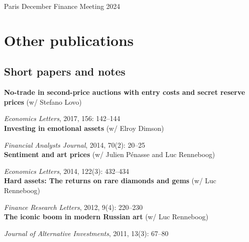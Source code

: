 \documentclass[a4paper]{article}
\begin{document}
Paris December Finance Meeting 2024 \\

\section*{Other publications}

\subsection*{Short papers and notes}

\textbf{No-trade in second-price auctions with entry costs and secret reserve prices} (w/ Stefano Lovo)

\textit{Economics Letters}, 2017, 156: 142--144\\

\textbf{Investing in emotional assets} (w/ Elroy Dimson)

\textit{Financial Analysts Journal}, 2014, 70(2): 20--25\\

\textbf{Sentiment and art prices} (w/ Julien P\'enasse and Luc Renneboog)

\textit{Economics Letters}, 2014, 122(3): 432--434\\

\textbf{Hard assets: The returns on rare diamonds and gems} (w/ Luc Renneboog)

\textit{Finance Research Letters}, 2012, 9(4): 220--230\\

\textbf{The iconic boom in modern Russian art} (w/ Luc Renneboog)

\textit{Journal of Alternative Investments}, 2011, 13(3): 67--80
\end{document}
